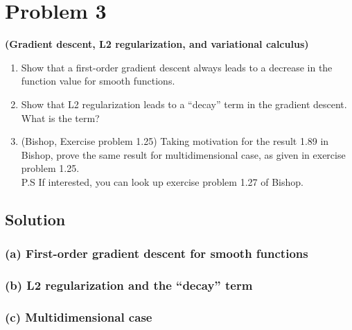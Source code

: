 \section*{Problem 3}

\textbf{(Gradient descent, L2 regularization, and variational calculus)}
\begin{enumerate}[label= (\alph*), noitemsep, topsep=0pt]
    \item Show that a first-order gradient descent always leads to a decrease in the function value for smooth functions.

    \item Show that L2 regularization leads to a ``decay'' term in the gradient descent.
          What is the term?

    \item (Bishop, Exercise problem 1.25) Taking motivation for the result 1.89 in Bishop, prove the same result for multidimensional case, as given in exercise problem 1.25.\\
          P.S If interested, you can look up exercise problem 1.27 of Bishop.
\end{enumerate}

\subsection*{Solution}

\subsubsection*{(a) First-order gradient descent for smooth functions}

\subsubsection*{(b) L2 regularization and the ``decay'' term}

\subsubsection*{(c) Multidimensional case}
